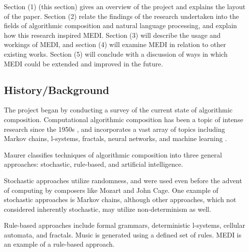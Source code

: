 \documentclass[runningheads,a4paper]{llncs}
\begin{document}
Section (1) (this section) gives an overview of the project and explains the layout
of the paper. Section (2) relate the findings of the research undertaken into the
fields of algorithmic composition and natural language processing, and explain
how this research inspired MEDI. Section (3) will describe the usage and workings
of MEDI, and section (4) will examine MEDI in relation to other existing works.
Section (5) will conclude with a discussion of ways in which MEDI could be
extended and improved in the future.




\subsection{History/Background}

The project began by conducting a survey of the current state of algorithmic
composition. Computational algorithmic composition has been a topic of intense
research since the 1950s \cite{edwards11}, and incorporates a vast array of
topics including Markov chains, l-systems, fractals, neural networks, and
machine learning \cite{nierhaus09}.

Maurer \cite{maurer99} classifies techniques of algorithmic composition into
three general approaches: stochastic, rule-based, and artificial intelligence.

Stochastic approaches utilize randomness, and were used even before the advent
of computing by composers like Mozart and John Cage. One example of stochastic
approaches is Markov chains, although other
approaches, which not considered inherently stochastic, may utilize
non-determinism as well.

Rule-based approaches include formal grammars, deterministic l-systems, cellular
automata, and fractals. Music is generated using a defined set of rules. MEDI is
an example of a rule-based approach.
\end{document}

